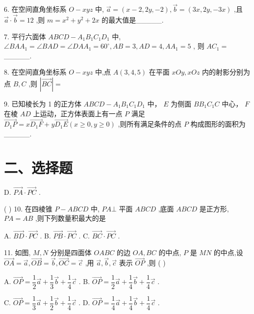 6. 在空间直角坐标系 $O - {xyz}$ 中, $\overrightarrow{a} = \left( {x - 2,{2y}, - 2}\right) ,\overrightarrow{b} = \left( {{3x},{2y}, - {3x}}\right)$ ,且 $\overrightarrow{a} \cdot  \overrightarrow{b} = {12}$ ,则 $m = {x}^{2} + {y}^{2}  + {2x}$ 的最大值是\_\_\_\_\_.

7. 平行六面体 ${ABCD} - {A}_{1}{B}_{1}{C}_{1}{D}_{1}$ 中, $\angle {BA}{A}_{1} = \angle {BAD} = \angle {DA}{A}_{1} = {60}^{ \circ  },{AB} = 3,{AD} = 4,A{A}_{1} = 5$ , 则 $A{C}_{1} =$ \_\_\_\_\_.

8. 在空间直角坐标系 $O - {xyz}$ 中,点 $A\left( {3,4,5}\right)$ 在平面 ${xOy},{xOz}$ 内的射影分别为点 $B,C$ ,则 $\left| \overrightarrow{BC}\right|  =$

9. 已知棱长为 1 的正方体 ${ABCD} - {A}_{1}{B}_{1}{C}_{1}{D}_{1}$ 中， $E$ 为侧面 $B{B}_{1}{C}_{1}C$ 中心， $F$ 在棱 ${AD}$ 上运动，正方体表面上有一点 $P$ 满足 $\overrightarrow{{D}_{1}P} = x\overrightarrow{{D}_{1}F} + y\overrightarrow{{D}_{1}E}\left( {x \geq  0,y \geq  0}\right)$ ,则所有满足条件的点 $P$ 构成图形的面积为\_\_\_\_\_.

\section*{二、选择题}

D. $\overrightarrow{PA} \cdot  \overrightarrow{PC}$ .

( ) 10. 在四棱锥 $P - {ABCD}$ 中, ${PA} \bot$ 平面 ${ABCD}$ ,底面 ${ABCD}$ 是正方形, ${PA} = {AB}$ ,则下列数量积最大的是

A. $\overrightarrow{BD} \cdot  \overrightarrow{PC}$ . B. $\overrightarrow{PB} \cdot  \overrightarrow{PC}$ . C. $\overrightarrow{BC} \cdot  \overrightarrow{PC}$ .

11. 如图, $M,N$ 分别是四面体 ${OABC}$ 的边 ${OA},{BC}$ 的中点, $P$ 是 ${MN}$ 的中点,设 $\overrightarrow{OA} = \overrightarrow{a},\overrightarrow{OB} = \overrightarrow{b},\overrightarrow{OC} =  \overrightarrow{c}$ ,用 $\overrightarrow{a},\overrightarrow{b},\overrightarrow{c}$ 表示 $\overrightarrow{OP}$ ,则 ( )

A. $\overrightarrow{OP} = \dfrac{1}{2}\overrightarrow{a} + \dfrac{1}{3}\overrightarrow{b} + \dfrac{1}{4}\overrightarrow{c}$ . B. $\overrightarrow{OP} = \dfrac{1}{2}\overrightarrow{a} + \dfrac{1}{4}\overrightarrow{b} + \dfrac{1}{4}\overrightarrow{c}$ .

C. $\overrightarrow{OP} = \dfrac{1}{3}\overrightarrow{a} + \dfrac{1}{2}\overrightarrow{b} + \dfrac{1}{4}\overrightarrow{c}$ . D. $\overrightarrow{OP} = \dfrac{1}{4}\overrightarrow{a} + \dfrac{1}{4}\overrightarrow{b} + \dfrac{1}{4}\overrightarrow{c}$ .


